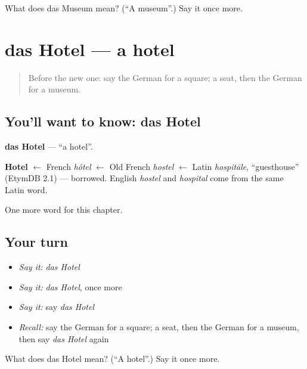 \begin{tcolorbox}[breakable,colback=teal!4,colframe=teal!35!black,title={Before you move on}]
What does das Museum mean? (\textquotedblleft{}A museum\textquotedblright{}.) Say it once more.
\end{tcolorbox}
\section[das Hotel]{das Hotel — a hotel}

\label{lesson:GE-C104-hotel}



\begin{quote}
Before the new one: say the German for a square; a seat, then the German for a museum.
\end{quote}

\subsection*{You'll want to know: das Hotel}
\textbf{das Hotel} — \textquotedblleft{}a hotel\textquotedblright{}.

\begin{cousinweb}
\textbf{Hotel} $\leftarrow$ French \emph{hôtel} $\leftarrow$ Old French \emph{hostel} $\leftarrow$ Latin \emph{hospitāle}, \textquotedblleft{}guesthouse\textquotedblright{} (EtymDB 2.1) — borrowed. English \emph{hostel} and \emph{hospital} come from the same Latin word.
\end{cousinweb}

\begin{grammarlens}[title={What you've built}]
One more word for this chapter.
\end{grammarlens}

\subsection*{Your turn}
\begin{itemize}
\raggedright
  \item \emph{Say it:} \emph{das Hotel}
  \item \emph{Say it:} \emph{das Hotel}, once more
  \item \emph{Say it:} say \emph{das Hotel}
  \item \emph{Recall:} say the German for a square; a seat, then the German for a museum, then say \emph{das Hotel} again
\end{itemize}

\begin{tcolorbox}[breakable,colback=teal!4,colframe=teal!35!black,title={Before you move on}]
What does das Hotel mean? (\textquotedblleft{}A hotel\textquotedblright{}.) Say it once more.
\end{tcolorbox}
